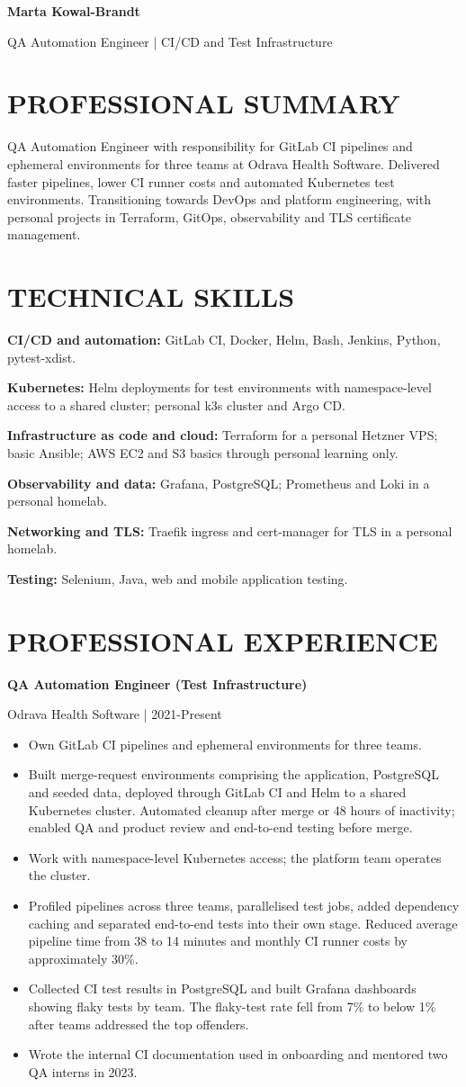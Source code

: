 \documentclass[11pt,a4paper]{article}
\newcommand{\cvsection}[1]{\section*{#1}}
\begin{document}
{\LARGE\bfseries\color{primarycolor} Marta Kowal-Brandt}\par
{\large\color{accentcolor} QA Automation Engineer | CI/CD and Test Infrastructure}

\cvsection{PROFESSIONAL SUMMARY}
QA Automation Engineer with responsibility for GitLab CI pipelines and ephemeral environments for three teams at Odrava Health Software. Delivered faster pipelines, lower CI runner costs and automated Kubernetes test environments. Transitioning towards DevOps and platform engineering, with personal projects in Terraform, GitOps, observability and TLS certificate management.

\cvsection{TECHNICAL SKILLS}
\textbf{CI/CD and automation:} GitLab CI, Docker, Helm, Bash, Jenkins, Python, pytest-xdist.\par
\textbf{Kubernetes:} Helm deployments for test environments with namespace-level access to a shared cluster; personal k3s cluster and Argo CD.\par
\textbf{Infrastructure as code and cloud:} Terraform for a personal Hetzner VPS; basic Ansible; AWS EC2 and S3 basics through personal learning only.\par
\textbf{Observability and data:} Grafana, PostgreSQL; Prometheus and Loki in a personal homelab.\par
\textbf{Networking and TLS:} Traefik ingress and cert-manager for TLS in a personal homelab.\par
\textbf{Testing:} Selenium, Java, web and mobile application testing.

\cvsection{PROFESSIONAL EXPERIENCE}
\textbf{QA Automation Engineer (Test Infrastructure)}\par
Odrava Health Software | 2021-Present
\begin{itemize}
\item Own GitLab CI pipelines and ephemeral environments for three teams.
\item Built merge-request environments comprising the application, PostgreSQL and seeded data, deployed through GitLab CI and Helm to a shared Kubernetes cluster. Automated cleanup after merge or 48 hours of inactivity; enabled QA and product review and end-to-end testing before merge.
\item Work with namespace-level Kubernetes access; the platform team operates the cluster.
\item Profiled pipelines across three teams, parallelised test jobs, added dependency caching and separated end-to-end tests into their own stage. Reduced average pipeline time from 38 to 14 minutes and monthly CI runner costs by approximately 30\%.
\item Collected CI test results in PostgreSQL and built Grafana dashboards showing flaky tests by team. The flaky-test rate fell from 7\% to below 1\% after teams addressed the top offenders.
\item Wrote the internal CI documentation used in onboarding and mentored two QA interns in 2023.
\end{itemize}
\end{document}
